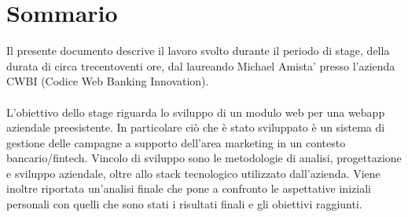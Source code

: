 \cleardoublepage
{}
{}
\begingroup
\let\clearpage\relax
\let\cleardoublepage\relax
\let\cleardoublepage\relax

\chapter*{Sommario}

Il presente documento descrive il lavoro svolto durante il periodo di stage, della durata di circa trecentoventi ore, dal laureando Michael Amista' presso l'azienda CWBI (Codice Web Banking Innovation).
\\
\\
L'obiettivo dello stage riguarda lo sviluppo di un modulo web per una webapp aziendale preesistente. In particolare ciò che è stato sviluppato è un sistema di gestione delle campagne a supporto dell'area marketing in un contesto bancario/fintech. Vincolo di sviluppo sono le metodologie di analisi, progettazione e sviluppo aziendale, oltre allo stack tecnologico utilizzato dall'azienda. Viene inoltre riportata un'analisi finale che pone a confronto le aspettative iniziali personali con quelli che sono stati i risultati finali e gli obiettivi raggiunti.




\endgroup

\vfill
